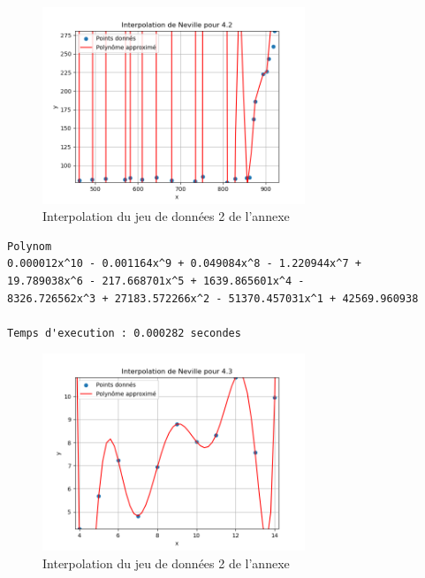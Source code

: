 \begin{figure}[h]
    \centering
    \includegraphics[width=0.7\textwidth]{sources/Corentin/polynomApproch/results/graphs/42.png}
    \caption{Interpolation du jeu de données 2 de l'annexe}
\end{figure}
\newpage
\begin{lstlisting}[caption={Annexe 3 data} results, basicstyle=\fontsize{8}{10}\selectfont]
    Polynom
0.000012x^10 - 0.001164x^9 + 0.049084x^8 - 1.220944x^7 + 
19.789038x^6 - 217.668701x^5 + 1639.865601x^4 - 
8326.726562x^3 + 27183.572266x^2 - 51370.457031x^1 + 42569.960938

Temps d'execution : 0.000282 secondes
\end{lstlisting}
\begin{figure}[h]
    \centering
    \includegraphics[width=0.7\textwidth]{sources/Corentin/polynomApproch/results/graphs/43.png}
    \caption{Interpolation du jeu de données 2 de l'annexe}
\end{figure}
\newpage
